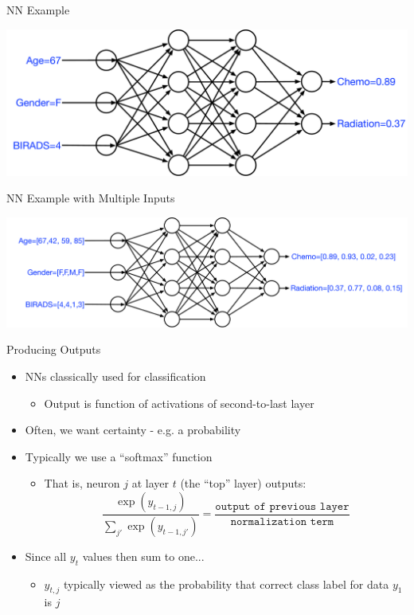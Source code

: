 \documentclass[aspectratio=169]{beamer}
\begin{document}
\begin{frame}{NN Example}

\includegraphics[width=1\textwidth]{lectFF/nnExample.pdf}
\end{frame}
\begin{frame}{NN Example with Multiple Inputs}

\includegraphics[width=1\textwidth]{lectFF/nnExampleN.pdf}
\end{frame}
\begin{frame}{Producing Outputs}

\begin{itemize}
	\item NNs classically used for classification
	\begin{itemize}
	\item Output is function of activations of second-to-last layer
        \end{itemize}
      	\item Often, we want certainty - e.g. a probability
	\item Typically we use a ``softmax'' function
	\begin{itemize}
	\item That is, neuron $j$ at layer $t$ (the ``top'' layer) outputs:
	$$\frac{\exp(y_{t-1,j})} {\sum_{j'} \exp(y_{t-1,j'})} = \frac{\texttt{output of previous layer}}{\texttt{normalization term}}$$
        \end{itemize}
	\item Since all $y_t$ values then sum to one...
	\begin{itemize}
	\item $y_{t,j}$ typically viewed as the probability that correct class label for data $y_1$ is $j$
        \end{itemize}
\end{itemize}
\end{frame}
\end{document}
